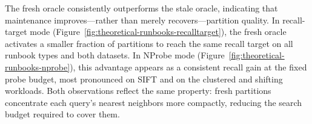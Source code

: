 \documentclass[sigconf,review,anonymous]{acmart}
\begin{document}

The fresh oracle consistently outperforms the stale oracle, indicating that maintenance improves---rather than merely recovers---partition quality. In recall-target mode (Figure~\ref{fig:theoretical-runbooks-recalltarget}), the fresh oracle activates a smaller fraction of partitions to reach the same recall target on all runbook types and both datasets. In NProbe mode (Figure~\ref{fig:theoretical-runbooks-nprobe}), this advantage appears as a consistent recall gain at the fixed probe budget, most pronounced on SIFT and on the clustered and shifting workloads. Both observations reflect the same property: fresh partitions concentrate each query's nearest neighbors more compactly, reducing the search budget required to cover them.

\end{document}
